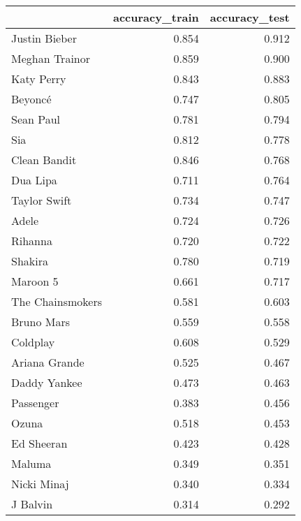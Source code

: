 \begin{tabular}{lrr}
\toprule
{} &  accuracy\_train &  accuracy\_test \\
\midrule
Justin Bieber    &           0.854 &          0.912 \\
Meghan Trainor   &           0.859 &          0.900 \\
Katy Perry       &           0.843 &          0.883 \\
Beyoncé          &           0.747 &          0.805 \\
Sean Paul        &           0.781 &          0.794 \\
Sia              &           0.812 &          0.778 \\
Clean Bandit     &           0.846 &          0.768 \\
Dua Lipa         &           0.711 &          0.764 \\
Taylor Swift     &           0.734 &          0.747 \\
Adele            &           0.724 &          0.726 \\
Rihanna          &           0.720 &          0.722 \\
Shakira          &           0.780 &          0.719 \\
Maroon 5         &           0.661 &          0.717 \\
The Chainsmokers &           0.581 &          0.603 \\
Bruno Mars       &           0.559 &          0.558 \\
Coldplay         &           0.608 &          0.529 \\
Ariana Grande    &           0.525 &          0.467 \\
Daddy Yankee     &           0.473 &          0.463 \\
Passenger        &           0.383 &          0.456 \\
Ozuna            &           0.518 &          0.453 \\
Ed Sheeran       &           0.423 &          0.428 \\
Maluma           &           0.349 &          0.351 \\
Nicki Minaj      &           0.340 &          0.334 \\
J Balvin         &           0.314 &          0.292 \\
\bottomrule
\end{tabular}
